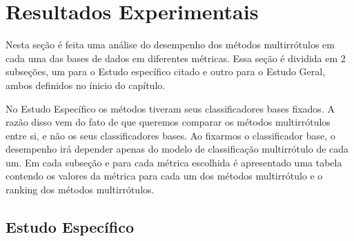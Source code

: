 

% 


\section{Resultados Experimentais}
\label{sec:exps}
Nesta seção é feita uma análise do desempenho dos métodos multirrótulos em cada uma das bases de dados
em diferentes métricas.
Essa seção é dividida em 2 subseções, um para o Estudo específico citado e
outro para o Estudo Geral, ambos definidos no ínicio do capítulo.

No Estudo Específico os métodos tiveram seus classificadores bases fixados.
A razão disso vem do fato de que queremos comparar os métodos multirrótulos entre si,
e não os seus classificadores bases.
Ao fixarmos o classificador base, 
o desempenho irá depender apenas do modelo de classificação multirrótulo
de cada um.
Em cada subseção e para cada métrica escolhida é apresentado uma tabela
contendo os valores da métrica para cada um dos métodos multirrótulo e
o ranking dos métodos multirrótulos.



\subsection{Estudo Específico}
% 
% 
% 
% 
% 
% 
% 
% 
% 
% 
% 
% 
% 
% 
% 








